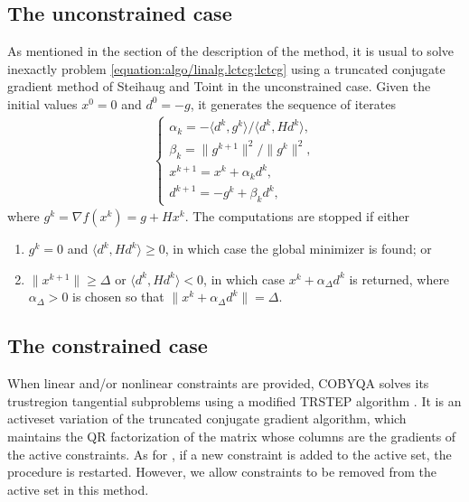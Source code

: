 \documentclass[letterpaper,10pt,english]{sphinxmanual}
\newcommand{\norm}[2][]{#1\lVert#2#1\rVert}
\newcommand{\inner}[2][]{#1\langle#2#1\rangle}
\begin{document}
\subsection{The unconstrained case}
\label{\detokenize{algo/linalg.lctcg:the-unconstrained-case}}
\sphinxAtStartPar
As mentioned in the section {\hyperref[\detokenize{algo/linalg.bvtcg:tcg-base}]{}} of the description of the 
method, it is usual to solve inexactly problem \eqref{equation:algo/linalg.lctcg:lctcg} using a truncated
conjugate gradient method of Steihaug  and Toint  in the
unconstrained case. Given the initial values \(x^0 = 0\) and
\(d^0 = -g\), it generates the sequence of iterates
\begin{equation*}
\begin{split}\left\{
\begin{array}{l}
    \alpha_k = -\inner{d^k, g^k} / \inner{d^k, Hd^k},\\
    \beta_k = \norm{g^{k + 1}}^2 / \norm{g^k}^2,\\
    x^{k + 1} = x^k + \alpha_k d^k,\\
    d^{k + 1} = -g^k + \beta_k d^k,
\end{array}
\right.\end{split}
\end{equation*}
\sphinxAtStartPar
where \(g^k = \nabla f(x^k) = g + Hx^k\). The computations are stopped if
either
\begin{enumerate}
%
\item {} 
\sphinxAtStartPar
\(g^k = 0\) and \(\inner{d^k, Hd^k} \ge 0\), in which case the
global minimizer is found; or

\item {} 
\sphinxAtStartPar
\(\norm{x^{k + 1}} \ge \Delta\) or \(\inner{d^k, Hd^k} < 0\), in
which case \(x^k + \alpha_{\Delta} d^k\) is returned, where
\(\alpha_{\Delta} > 0\) is chosen so that
\(\norm{x^k + \alpha_{\Delta} d^k} = \Delta\).

\end{enumerate}


\subsection{The constrained case}
\label{\detokenize{algo/linalg.lctcg:the-constrained-case}}
\sphinxAtStartPar
When linear and/or nonlinear constraints are provided, COBYQA solves its
trust\sphinxhyphen{}region tangential subproblems using a modified TRSTEP algorithm
. It is an active\sphinxhyphen{}set variation of the truncated conjugate gradient
algorithm, which maintains the QR factorization of the matrix whose columns are
the gradients of the active constraints. As for , if a new constraint is
added to the active set, the procedure is restarted. However, we allow
constraints to be removed from the active set in this method.
\end{document}

